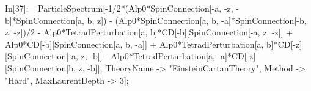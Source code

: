 In[37]:= ParticleSpectrum[-1/2*(Alp0*SpinConnection[-a, -z, -b]*SpinConnection[a, b, z]) - (Alp0*SpinConnection[a, b, -a]*SpinConnection[-b, z, -z])/2 - Alp0*TetradPerturbation[a, b]*CD[-b][SpinConnection[-a, z, -z]] + Alp0*CD[-b][SpinConnection[a, b, -a]] + Alp0*TetradPerturbation[a, b]*CD[-z][SpinConnection[-a, z, -b]] - Alp0*TetradPerturbation[a, -a]*CD[-z][SpinConnection[b, z, -b]], TheoryName -> "EinsteinCartanTheory", Method -> "Hard", MaxLaurentDepth -> 3]; 